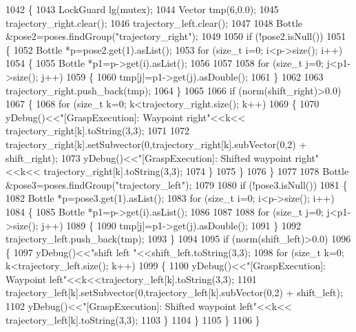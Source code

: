 \begin{DoxyCode}
1042 \{
1043     LockGuard lg(mutex);
1044     Vector tmp(6,0.0);
1045     trajectory_right.clear();
1046     trajectory_left.clear();
1047 
1048     Bottle &pose2=poses.findGroup(\textcolor{stringliteral}{"trajectory\_right"});
1049 
1050     \textcolor{keywordflow}{if} (!pose2.isNull())
1051     \{
1052         Bottle *p=pose2.get(1).asList();
1053         \textcolor{keywordflow}{for} (\textcolor{keywordtype}{size\_t} i=0; i<p->size(); i++)
1054         \{
1055             Bottle *p1=p->get(i).asList();
1056 
1057 
1058             \textcolor{keywordflow}{for} (\textcolor{keywordtype}{size\_t} j=0; j<p1->size(); j++)
1059             \{
1060                 tmp[j]=p1->get(j).asDouble();
1061             \}
1062 
1063             trajectory_right.push\_back(tmp);
1064         \}
1065 
1066         \textcolor{keywordflow}{if} (norm(shift_right)>0.0)
1067         \{
1068             \textcolor{keywordflow}{for} (\textcolor{keywordtype}{size\_t} k=0; k<trajectory_right.size(); k++)
1069             \{
1070                 yDebug()<<\textcolor{stringliteral}{"[GraspExecution]: Waypoint right"}<<k<<
      trajectory_right[k].toString(3,3);
1071                 
1072                 trajectory_right[k].setSubvector(0,trajectory_right[k].subVector(0,2) +
      shift_right);
1073                 yDebug()<<\textcolor{stringliteral}{"[GraspExecution]: Shifted waypoint right"}<<k<<
      trajectory_right[k].toString(3,3);
1074             \}
1075         \}
1076     \}
1077 
1078     Bottle &pose3=poses.findGroup(\textcolor{stringliteral}{"trajectory\_left"});
1079 
1080     \textcolor{keywordflow}{if} (!pose3.isNull())
1081     \{
1082         Bottle *p=pose3.get(1).asList();
1083         \textcolor{keywordflow}{for} (\textcolor{keywordtype}{size\_t} i=0; i<p->size(); i++)
1084         \{
1085             Bottle *p1=p->get(i).asList();
1086 
1087 
1088             \textcolor{keywordflow}{for} (\textcolor{keywordtype}{size\_t} j=0; j<p1->size(); j++)
1089             \{
1090                 tmp[j]=p1->get(j).asDouble();
1091             \}
1092             trajectory_left.push\_back(tmp);
1093         \}
1094 
1095         \textcolor{keywordflow}{if} (norm(shift_left)>0.0)
1096         \{
1097             yDebug()<<\textcolor{stringliteral}{"shift left "}<<shift_left.toString(3,3);
1098             \textcolor{keywordflow}{for} (\textcolor{keywordtype}{size\_t} k=0; k<trajectory_left.size(); k++)
1099             \{
1100                 yDebug()<<\textcolor{stringliteral}{"[GraspExecution]: Waypoint left"}<<k<<trajectory_left[k].toString(3,3);
1101                 trajectory_left[k].setSubvector(0,trajectory_left[k].subVector(0,2) +
      shift_left);
1102                 yDebug()<<\textcolor{stringliteral}{"[GraspExecution]: Shifted waypoint left"}<<k<<
      trajectory_left[k].toString(3,3);
1103             \}
1104         \}
1105     \}
1106 \}
\end{DoxyCode}
